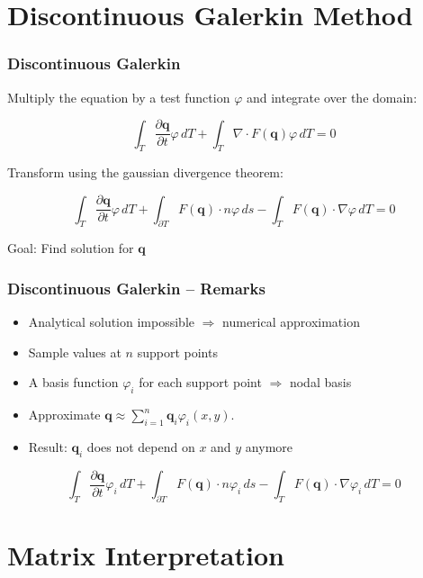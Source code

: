 \documentclass{beamer}
\newcommand{\pd}[2]{\dfrac{\partial #1}{\partial #2}}
\renewcommand{\phi}{\varphi}
\begin{document}
\section{Discontinuous Galerkin Method}
\label{sec:basis-functions-intro}

\begin{frame}
  \frametitle{Discontinuous Galerkin}
  Multiply the equation by a test function $\phi$ and integrate over the domain:
  
  \begin{equation}
    \label{eq:shallow-water-weak-form}
    \int_T \pd {\mathbf{q}}{t} \phi \, dT + \int_T \nabla \cdot F(\mathbf{q}) \phi \, dT = 0
  \end{equation}

  Transform using the gaussian divergence theorem:

  \begin{equation}
    \label{eq:shallow-water-dg}
    \int_T \pd {\mathbf{q}}{t} \phi \, dT +
    \int_{\partial T} F(\mathbf{q}) \cdot n \phi \, ds -
    \int_T F(\mathbf{q}) \cdot \nabla \phi \, dT = 0
  \end{equation}
  
  Goal: Find solution for $\mathbf{q}$
\end{frame}

\begin{frame}
  \frametitle{Discontinuous Galerkin -- Remarks}
  \begin{itemize}
  \item Analytical solution impossible $\Rightarrow$ numerical approximation
  \item Sample values at $n$ support points
  \item A basis function $\phi_i$ for each support point $\Rightarrow$ nodal basis
  \item Approximate 
    $\mathbf{q} \approx \sum_{i=1}^n \mathbf{q}_i \phi_i(x,y)$.
  \item Result: $\mathbf{q}_i$ does not depend on $x$ and $y$ anymore
  \end{itemize}

  \begin{equation}
    \label{eq:shallow-water-phi-i}
    \int_T \pd {\mathbf{q}}{t} \phi_i \, dT +
    \int_{\partial T} F(\mathbf{q}) \cdot n \phi_i \, ds -
    \int_T F(\mathbf{q}) \cdot \nabla \phi_i \, dT = 0
  \end{equation}
\end{frame}

\section{Matrix Interpretation}
\end{document}
